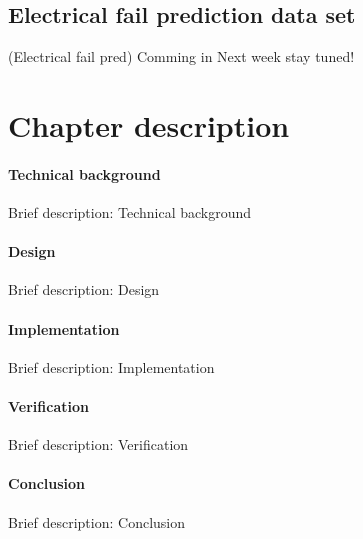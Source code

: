   \subsection{Electrical fail prediction data set}
(Electrical fail pred) Comming in Next week stay tuned!

\section{Chapter description}
		\paragraph{Technical background}

Brief description: Technical background

		\paragraph{Design}

Brief description: Design

		\paragraph{Implementation}

Brief description: Implementation

		\paragraph{Verification}

Brief description: Verification

		\paragraph{Conclusion}

Brief description: Conclusion

